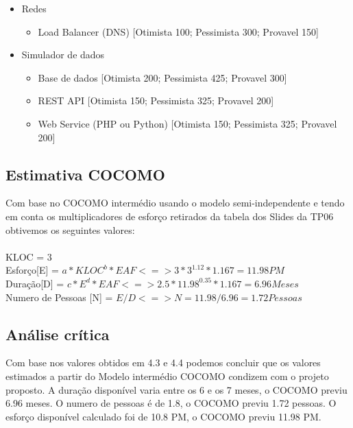 \documentclass[a4paper]{report}
\begin{document}
\begin{itemize}
\begin{itemize}
    \end{itemize}
\item Redes
    \begin{itemize}
    \item Load Balancer (DNS) [Otimista 100; Pessimista 300; Provavel 150]
    \end{itemize}
\item Simulador de dados
    \begin{itemize}
    \item Base de dados [Otimista 200; Pessimista 425; Provavel 300]
    \item REST API [Otimista 150; Pessimista 325; Provavel 200]
    \item Web Service (PHP ou Python) [Otimista 150; Pessimista 325; Provavel 200]
    \end{itemize}
\end{itemize}
\subsection{Estimativa COCOMO}
Com base no COCOMO intermédio usando o modelo semi-independente e tendo em conta os multiplicadores de esforço retirados da tabela dos Slides da TP06 \cite{slideTP6} obtivemos os seguintes valores:\\\\ KLOC = $3$ \\
Esforço[E] = $a * KLOC^{b} * EAF <=> 3 * 3^{1.12} * 1.167 = 11.98 PM$\\
Duração[D] = $c * E^{d} * EAF <=> 2.5 * 11.98^{0.35} * 1.167 = 6.96 Meses$\\
Numero de Pessoas [N] = $E / D <=> N = 11.98 / 6.96 = 1.72 Pessoas$
\subsection{Análise crítica}
\label{AC}
Com base nos valores obtidos em 4.3 e 4.4 podemos concluir que os valores estimados a partir do Modelo intermédio COCOMO condizem com o projeto proposto.
A duração disponível varia entre os 6 e os 7 meses, o COCOMO previu 6.96 meses.
O numero de pessoas é de 1.8, o COCOMO previu 1.72 pessoas.
O esforço disponível calculado foi de 10.8 PM, o COCOMO previu 11.98 PM.
\pagebreak
\end{document}
